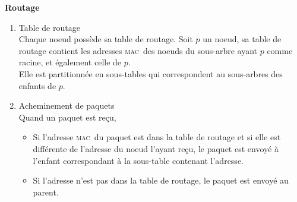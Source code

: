 \documentclass[a4paper, 12pt]{report}
\newcommand{\espmesh}{\textsc{esp-mesh}}
\newcommand{\mac}{\textsc{mac}}
\begin{document}
        \textbf{Routage}\newline
        \begin{enumerate}
            \item Table de routage\\
                Chaque noeud possède sa table de routage. Soit $p$ un noeud, sa table de routage contient les adresses \mac\ 
                des noeuds du sous-arbre ayant $p$ comme racine, et également celle de $p$.\\
                Elle est partitionnée en sous-tables qui correspondent au sous-arbres des enfants de $p$.
            \item Acheminement de paquets\\
                Quand un paquet est reçu,
                \begin{itemize}
                    \item Si l'adresse \mac\ du paquet est dans la table de routage et si elle est différente de l'adresse du noeud l'ayant reçu, le paquet est envoyé
                    à l'enfant correspondant à la sous-table contenant l'adresse.
                    \item Si l'adresse n'est pas dans la table de routage, le paquet est envoyé au parent.
                \end{itemize}

        \end{enumerate}
        \vspace{0.5cm}
\end{document}
